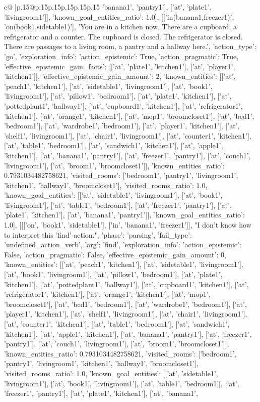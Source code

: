 \documentclass{article}
\begin{document}
{\begin{supertabular}{c@{$\;$}|p{.15\linewidth}@{}p{.15\linewidth}p{.15\linewidth}p{.15\linewidth}p{.15\linewidth}p{.15\linewidth}}
{{{'banana1', 'pantry1'], ['at', 'plate1', 'livingroom1']], 'known_goal_entities_ratio': 1.0}}], [['in(banana1,freezer1)', 'on(book1,sidetable1)'], 'You are in a kitchen now. There are a cupboard, a refrigerator and a counter. The cupboard is closed. The refrigerator is closed. There are passages to a living room, a pantry and a hallway here.', {'action_type': 'go', 'exploration_info': {'action_epistemic': True, 'action_pragmatic': True, 'effective_epistemic_gain_facts': [['at', 'plate1', 'kitchen1'], ['at', 'player1', 'kitchen1']], 'effective_epistemic_gain_amount': 2, 'known_entities': [['at', 'peach1', 'kitchen1'], ['at', 'sidetable1', 'livingroom1'], ['at', 'book1', 'livingroom1'], ['at', 'pillow1', 'bedroom1'], ['at', 'plate1', 'kitchen1'], ['at', 'pottedplant1', 'hallway1'], ['at', 'cupboard1', 'kitchen1'], ['at', 'refrigerator1', 'kitchen1'], ['at', 'orange1', 'kitchen1'], ['at', 'mop1', 'broomcloset1'], ['at', 'bed1', 'bedroom1'], ['at', 'wardrobe1', 'bedroom1'], ['at', 'player1', 'kitchen1'], ['at', 'shelf1', 'livingroom1'], ['at', 'chair1', 'livingroom1'], ['at', 'counter1', 'kitchen1'], ['at', 'table1', 'bedroom1'], ['at', 'sandwich1', 'kitchen1'], ['at', 'apple1', 'kitchen1'], ['at', 'banana1', 'pantry1'], ['at', 'freezer1', 'pantry1'], ['at', 'couch1', 'livingroom1'], ['at', 'broom1', 'broomcloset1']], 'known_entities_ratio': 0.7931034482758621, 'visited_rooms': ['bedroom1', 'pantry1', 'livingroom1', 'kitchen1', 'hallway1', 'broomcloset1'], 'visited_rooms_ratio': 1.0, 'known_goal_entities': [['at', 'sidetable1', 'livingroom1'], ['at', 'book1', 'livingroom1'], ['at', 'table1', 'bedroom1'], ['at', 'freezer1', 'pantry1'], ['at', 'plate1', 'kitchen1'], ['at', 'banana1', 'pantry1']], 'known_goal_entities_ratio': 1.0}}], [[['on', 'book1', 'sidetable1'], ['in', 'banana1', 'freezer1']], "I don't know how to interpret this 'find' action.", {'phase': 'parsing', 'fail_type': 'undefined_action_verb', 'arg': 'find', 'exploration_info': {'action_epistemic': False, 'action_pragmatic': False, 'effective_epistemic_gain_amount': 0, 'known_entities': [['at', 'peach1', 'kitchen1'], ['at', 'sidetable1', 'livingroom1'], ['at', 'book1', 'livingroom1'], ['at', 'pillow1', 'bedroom1'], ['at', 'plate1', 'kitchen1'], ['at', 'pottedplant1', 'hallway1'], ['at', 'cupboard1', 'kitchen1'], ['at', 'refrigerator1', 'kitchen1'], ['at', 'orange1', 'kitchen1'], ['at', 'mop1', 'broomcloset1'], ['at', 'bed1', 'bedroom1'], ['at', 'wardrobe1', 'bedroom1'], ['at', 'player1', 'kitchen1'], ['at', 'shelf1', 'livingroom1'], ['at', 'chair1', 'livingroom1'], ['at', 'counter1', 'kitchen1'], ['at', 'table1', 'bedroom1'], ['at', 'sandwich1', 'kitchen1'], ['at', 'apple1', 'kitchen1'], ['at', 'banana1', 'pantry1'], ['at', 'freezer1', 'pantry1'], ['at', 'couch1', 'livingroom1'], ['at', 'broom1', 'broomcloset1']], 'known_entities_ratio': 0.7931034482758621, 'visited_rooms': ['bedroom1', 'pantry1', 'livingroom1', 'kitchen1', 'hallway1', 'broomcloset1'], 'visited_rooms_ratio': 1.0, 'known_goal_entities': [['at', 'sidetable1', 'livingroom1'], ['at', 'book1', 'livingroom1'], ['at', 'table1', 'bedroom1'], ['at', 'freezer1', 'pantry1'], ['at', 'plate1', 'kitchen1'], ['at', 'banana1', }}}
\end{supertabular}}
\end{document}
